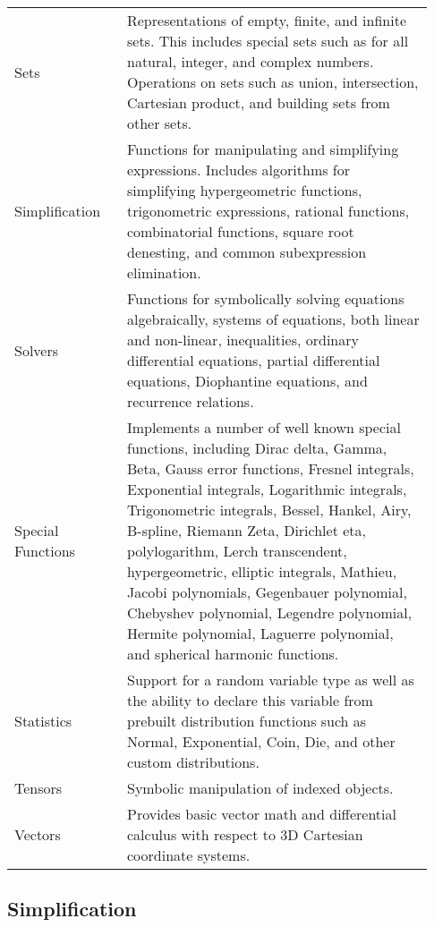 \begin{longtable}[htbc]{p{0.25\linewidth}p{0.68\linewidth}}
Sets & Representations of empty, finite, and infinite sets. This includes
special sets such as for all natural, integer, and complex numbers. Operations
on sets such as union, intersection, Cartesian product, and building sets from
other sets.\\

Simplification & Functions for manipulating and simplifying expressions.
Includes algorithms for simplifying hypergeometric functions, trigonometric
expressions, rational functions, combinatorial functions, square root
denesting, and common subexpression elimination.\\

Solvers & Functions for symbolically solving equations algebraically, systems
of equations, both linear and non-linear, inequalities, ordinary differential
equations, partial differential equations, Diophantine equations, and
recurrence relations.\\

Special Functions & Implements a number of well known special functions,
including Dirac delta, Gamma, Beta, Gauss error functions, Fresnel integrals,
Exponential integrals, Logarithmic integrals, Trigonometric integrals, Bessel,
Hankel, Airy, B-spline, Riemann Zeta, Dirichlet eta, polylogarithm, Lerch
transcendent, hypergeometric, elliptic integrals, Mathieu, Jacobi polynomials,
Gegenbauer polynomial, Chebyshev polynomial, Legendre polynomial, Hermite
polynomial, Laguerre polynomial, and
spherical harmonic functions.\\

Statistics & Support for a random variable type as well as the ability to
declare this variable from prebuilt distribution functions such as
Normal, Exponential, Coin, Die, and other custom distributions.\\

Tensors & Symbolic manipulation of indexed objects.\\

Vectors & Provides basic vector math and differential calculus with respect
to 3D Cartesian coordinate systems.\\
\bottomrule

\end{longtable}

\subsection{Simplification}



